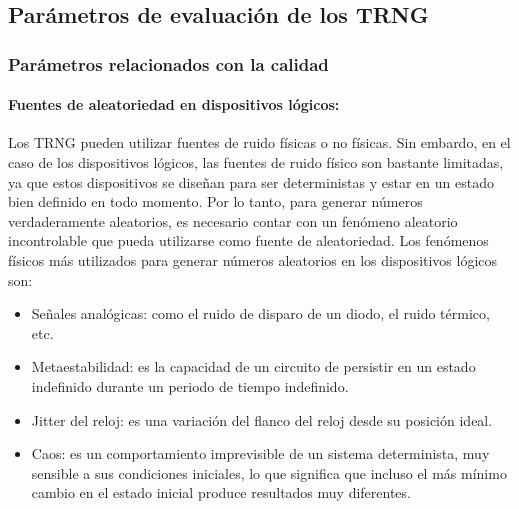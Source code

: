         \subsection{Parámetros de evaluación de los TRNG}
			
            \subsubsection{Parámetros relacionados con la calidad}	

                \paragraph{Fuentes de aleatoriedad en dispositivos lógicos:\\} 

                Los TRNG pueden utilizar fuentes de ruido físicas o no físicas. Sin embardo, en el caso de los dispositivos lógicos, las fuentes de ruido físico son bastante limitadas, ya que estos dispositivos se diseñan para ser deterministas y estar en un estado bien definido en todo momento. Por lo tanto, para generar números verdaderamente aleatorios, es necesario contar con un fenómeno aleatorio incontrolable que pueda utilizarse como fuente de aleatoriedad. Los fenómenos físicos más utilizados para generar números aleatorios en los dispositivos lógicos son:
	
                \begin{itemize}[noitemsep]
                    \item Señales analógicas: como el ruido de disparo de un diodo, el ruido térmico, etc.		

                    \item Metaestabilidad: es la capacidad de un circuito de persistir en un estado indefinido durante un periodo de tiempo indefinido.
                    
                    \item Jitter del reloj: es una variación del flanco del reloj desde su posición ideal.
                    
                    \item Caos: es un comportamiento imprevisible de un sistema determinista, muy sensible a sus condiciones iniciales, lo que significa que incluso el más mínimo cambio en el estado inicial produce resultados muy diferentes.
                    
                \end{itemize}		
	
